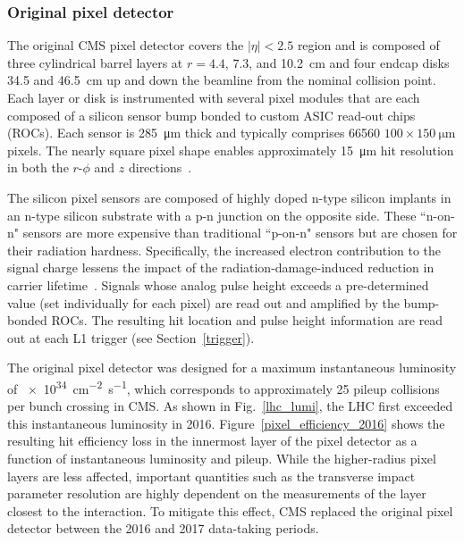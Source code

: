 \subsubsection{Original pixel detector}
The original CMS pixel detector covers the $|\eta|<2.5$ region and is composed of three cylindrical barrel layers at $r=4.4$, $7.3$, and \SI{10.2}{\cm} and four endcap disks \num{34.5} and \SI{46.5}{\cm} up and down the beamline from the nominal collision point. Each layer or disk is instrumented with several pixel modules that are each composed of a silicon sensor bump bonded to custom ASIC read-out chips (ROCs). Each sensor is \SI{285}{\um} thick and typically comprises \num{66560} $100\times\SI{150}{\um}$ pixels. The nearly square pixel shape enables approximately \SI{15}{\um} hit resolution in both the $r$-$\phi$ and $z$ directions~\cite{cms_tdr_v1, cms_experiment}.

The silicon pixel sensors are composed of highly doped n-type silicon implants in an n-type silicon substrate with a p-n junction on the opposite side. These ``n-on-n" sensors are more expensive than traditional ``p-on-n" sensors but are chosen for their radiation hardness. Specifically, the increased electron contribution to the signal charge lessens the impact of the radiation-damage-induced reduction in carrier lifetime~\cite{cms_experiment, pdg_2020}. Signals whose analog pulse height exceeds a pre-determined value (set individually for each pixel) are read out and amplified by the bump-bonded ROCs. The resulting hit location and pulse height information are read out at each L1 trigger (see Section~\ref{trigger}).

The original pixel detector was designed for a maximum instantaneous luminosity of \SI{e34}{\cm\tothe{-2}\s\tothe{-1}}, which corresponds to approximately 25 pileup collisions per bunch crossing in CMS. As shown in Fig.~\ref{lhc_lumi}, the LHC first exceeded this instantaneous luminosity in 2016. Figure~\ref{pixel_efficiency_2016} shows the resulting hit efficiency loss in the innermost layer of the pixel detector as a function of instantaneous luminosity and pileup. While the higher-radius pixel layers are less affected, important quantities such as the transverse impact parameter resolution are highly dependent on the measurements of the layer closest to the interaction. To mitigate this effect, CMS replaced the original pixel detector between the 2016 and 2017 data-taking periods. 



